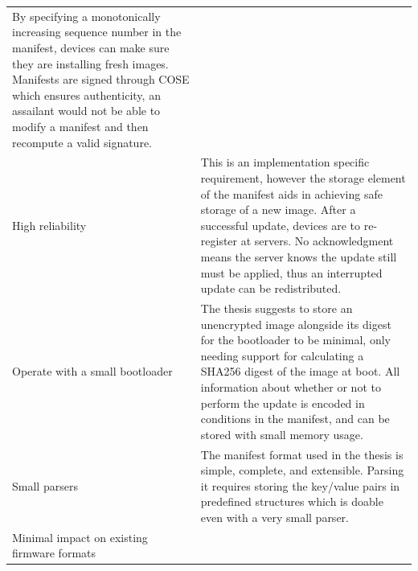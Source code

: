 \documentclass[0-thesis.tex]{subfiles}
\begin{document}
\begin{small}
\begin{longtable}[]{@{}ll@{}}
\begin{minipage}[t]{0.53\columnwidth}
    By specifying a monotonically increasing sequence number in the
    manifest, devices can make sure they are installing fresh images.
    Manifests are signed through COSE which ensures authenticity, an
    assailant would not be able to modify a manifest and then recompute a
    valid signature.\strut
    \end{minipage}\tabularnewline
    \begin{minipage}[t]{0.41\columnwidth}\raggedright\strut
    High reliability\strut
    \end{minipage} & \begin{minipage}[t]{0.53\columnwidth}\raggedright\strut
    This is an implementation specific requirement, however the storage
    element of the manifest aids in achieving safe storage of a new image.
    After a successful update, devices are to re-register at servers. No
    acknowledgment means the server knows the update still must be applied,
    thus an interrupted update can be redistributed.\strut
    \end{minipage}\tabularnewline
    \begin{minipage}[t]{0.41\columnwidth}\raggedright\strut
    Operate with a small bootloader\strut
    \end{minipage} & \begin{minipage}[t]{0.53\columnwidth}\raggedright\strut
    The thesis suggests to store an unencrypted image alongside its digest
    for the bootloader to be minimal, only needing support for calculating a
    SHA256 digest of the image at boot. All information about whether or not
    to perform the update is encoded in conditions in the manifest, and can
    be stored with small memory usage.\strut
    \end{minipage}\tabularnewline
    \begin{minipage}[t]{0.41\columnwidth}\raggedright\strut
    Small parsers\strut
    \end{minipage} & \begin{minipage}[t]{0.53\columnwidth}\raggedright\strut
    The manifest format used in the thesis is simple, complete, and
    extensible. Parsing it requires storing the key/value pairs in
    predefined structures which is doable even with a very small
    parser.\strut
    \end{minipage}\tabularnewline
    \begin{minipage}[t]{0.41\columnwidth}\raggedright\strut
    Minimal impact on existing firmware formats\strut
    \end{minipage} & \begin{minipage}[t]{0.53\columnwidth}\raggedright\strut

\end{minipage}
\end{longtable}
\end{small}
\end{document}
